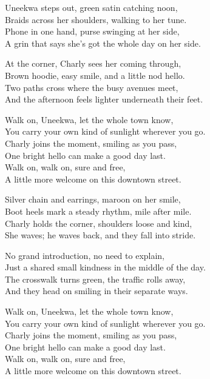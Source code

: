 \begin{lyrics}
Uneekwa steps out, green satin catching noon,\\
Braids across her shoulders, walking to her tune.\\
Phone in one hand, purse swinging at her side,\\
A grin that says she’s got the whole day on her side.

At the corner, Charly sees her coming through,\\
Brown hoodie, easy smile, and a little nod hello.\\
Two paths cross where the busy avenues meet,\\
And the afternoon feels lighter underneath their feet.

Walk on, Uneekwa, let the whole town know,\\
You carry your own kind of sunlight wherever you go.\\
Charly joins the moment, smiling as you pass,\\
One bright hello can make a good day last.\\
Walk on, walk on, sure and free,\\
A little more welcome on this downtown street.

Silver chain and earrings, maroon on her smile,\\
Boot heels mark a steady rhythm, mile after mile.\\
Charly holds the corner, shoulders loose and kind,\\
She waves; he waves back, and they fall into stride.

No grand introduction, no need to explain,\\
Just a shared small kindness in the middle of the day.\\
The crosswalk turns green, the traffic rolls away,\\
And they head on smiling in their separate ways.

Walk on, Uneekwa, let the whole town know,\\
You carry your own kind of sunlight wherever you go.\\
Charly joins the moment, smiling as you pass,\\
One bright hello can make a good day last.\\
Walk on, walk on, sure and free,\\
A little more welcome on this downtown street.


\end{lyrics}
